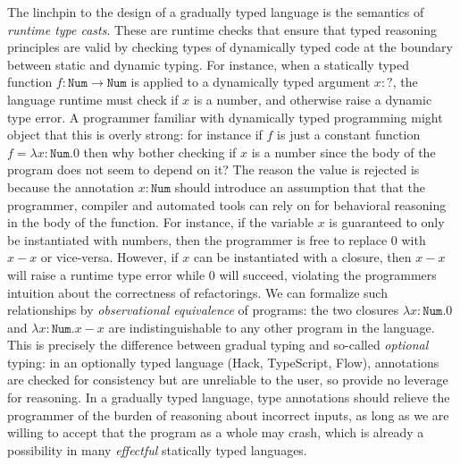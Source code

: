 \documentclass[acmsmall,nonacm]{acmart}
\newcommand{\dyn}{{?}}
\begin{document}
The linchpin to the design of a gradually typed language is the
semantics of \emph{runtime type casts}.  These are runtime checks that ensure
that typed reasoning principles are valid by checking types of dynamically typed
code at the boundary between static and dynamic typing.
%
For instance, when a statically typed function $f : \texttt{Num} \to
\texttt{Num}$ is applied to a dynamically typed argument $x : \dyn$,
the language runtime must check if $x$ is a number, and otherwise
raise a dynamic type error.
%
A programmer familiar with dynamically typed programming might object
that this is overly strong: for instance if $f$ is just a constant
function $f = \lambda x:\texttt{Num}. 0$ then why bother checking if
$x$ is a number since the body of the program does not seem to depend
on it?
%
The reason the value is rejected is because the annotation $x :
\texttt{Num}$ should introduce an assumption that that the programmer,
compiler and automated tools can rely on for behavioral reasoning in the
body of the function.  
%
For instance, if the variable $x$ is guaranteed to only be
instantiated with numbers, then the programmer is free to replace $0$
with $x - x$ or vice-versa.
%
However, if $x$ can be instantiated with a closure, then $x - x$ will
raise a runtime type error while $0$ will succeed, violating the
programmers intuition about the correctness of refactorings.
%
We can formalize such relationships by \emph{observational equivalence} of
programs: the two closures $\lambda x:\texttt{Num}. 0$ and $\lambda
x:\texttt{Num}. x - x$ are indistinguishable to any other program in
the language.
%
This is precisely the difference between gradual typing and so-called
\emph{optional} typing: in an optionally typed language (Hack,
TypeScript, Flow), annotations are checked for consistency but are unreliable
to the user, so provide no leverage for reasoning.  
%
In a gradually typed language, type annotations should relieve the
programmer of the 
burden of reasoning about incorrect inputs, as long as we are willing to accept that the program
as a whole may crash, which is already a possibility in many \emph{effectful}
statically typed languages.
%
\end{document}
